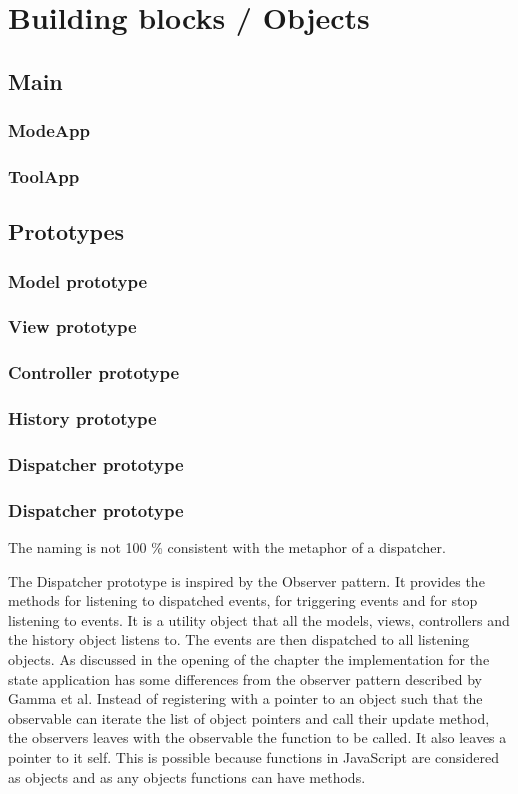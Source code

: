 \documentclass[english]{ifimaster}
\begin{document}
\section{Building blocks / Objects}
\subsection{Main}
\subsubsection{ModeApp}
\subsubsection{ToolApp}

\subsection{Prototypes}
\subsubsection{Model prototype}
\subsubsection{View prototype}
\subsubsection{Controller prototype}
\subsubsection{History prototype}
\subsubsection{Dispatcher prototype}
\subsubsection{Dispatcher prototype}
The naming is not 100 \% consistent with the metaphor of a dispatcher. 

The Dispatcher prototype is inspired by the Observer pattern. It provides the methods for listening to dispatched events, for triggering events and for stop listening to events. It is a utility object that all the models, views, controllers and the history object listens to. The events are then dispatched to all listening objects. As discussed in the opening of the chapter the implementation for the state application has some differences from the observer pattern described by Gamma et al. Instead of registering with a pointer to an object such that the observable can iterate the list of object pointers and call their update method, the observers leaves with the observable the function to be called. It also leaves a pointer to it self. This is possible because functions in JavaScript are considered as objects and as any objects functions can have methods.
\end{document}
